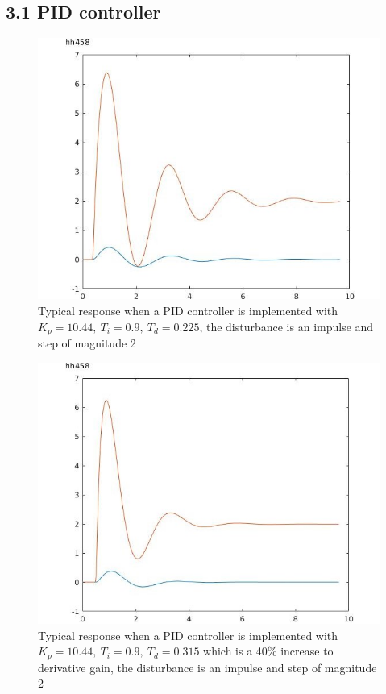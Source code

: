 \documentclass[twoside,twocolumn]{article}
\begin{document}
\subsection{3.1 PID controller}
\begin{figure}[h]
  \centering
    \includegraphics[width=\linewidth]{3-1_first_kd}
  \caption{Typical response when a PID controller is implemented with $K_p = 10.44,\:T_i=0.9,\:T_d=0.225$, the disturbance is an impulse and step of magnitude 2}
  \label{fig:3-1first}
\end{figure}

\begin{figure}[h]
  \centering
    \includegraphics[width=\linewidth]{3-1_increased_kd}
  \caption{Typical response when a PID controller is implemented with $K_p = 10.44,\:T_i=0.9,\:T_d=0.315$ which is a 40\% increase to derivative gain, the disturbance is an impulse and step of magnitude 2}
  \label{fig:3-1increased}
\end{figure}
\end{document}
